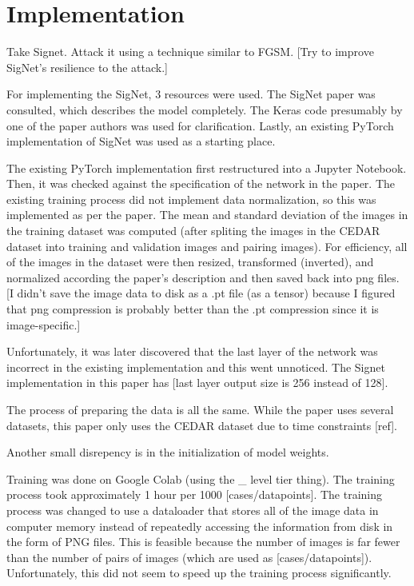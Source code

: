 \section{Implementation}\label{sec:implementation}

Take Signet.
Attack it using a technique similar to FGSM.
[Try to improve SigNet's resilience to the attack.]

For implementing the SigNet, 3 resources were used.
The SigNet paper was consulted, which describes the model completely\cite{sig_net}.
The Keras code presumably by one of the paper authors was used for clarification\cite{GitHub_sounakdey}.
Lastly, an existing PyTorch implementation of SigNet was used as a starting place\cite{GitHub_signet_pytorch}.

The existing PyTorch implementation first restructured into a Jupyter Notebook.
Then, it was checked against the specification of the network in the paper.
The existing training process did not implement data normalization, so this was implemented as per the paper.
The mean and standard deviation of the images in the training dataset was computed (after spliting the images in the CEDAR dataset into training and validation images and pairing images).
For efficiency, all of the images in the dataset were then resized, transformed (inverted), and normalized according the paper's description and then saved back into png files.
[I didn't save the image data to disk as a .pt file (as a tensor) because I figured that png compression is probably better than the .pt compression since it is image-specific.]

Unfortunately, it was later discovered that the last layer of the network was incorrect in the existing implementation and this went unnoticed.
The Signet implementation in this paper has [last layer output size is 256 instead of 128].

The process of preparing the data is all the same.
While the paper uses several datasets, this paper only uses the CEDAR dataset due to time constraints [ref].

Another small disrepency is in the initialization of model weights.

Training was done on Google Colab (using the \_ level tier thing).
The training process took approximately 1 hour per 1000 [cases/datapoints].
The training process was changed to use a dataloader that stores all of the image data in computer memory instead of repeatedly accessing the information from disk in the form of PNG files.
This is feasible because the number of images is far fewer than the number of pairs of images (which are used as [cases/datapoints]).
Unfortunately, this did not seem to speed up the training process significantly.

